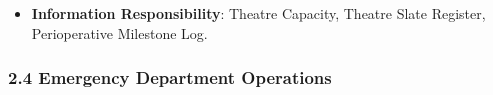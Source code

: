 \begin{itemize}
\begin{itemize}
\begin{itemize}
\item
\emph{Governed Process}: \textbf{Theatre Case Progression Process}.



\end{itemize}


\end{itemize}


\item
\textbf{Information Responsibility}: Theatre Capacity, Theatre Slate Register, Perioperative Milestone Log.



\end{itemize}
\label{rad:hso:118}

\par\smallskip
{}\label{rad:hso:120}
\subsubsection*{2.4 Emergency Department Operations}
\label{rad:hso:121}

